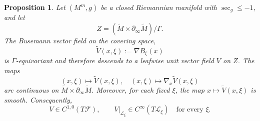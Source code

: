 \documentclass[12pt]{amsart}
\newtheorem{proposition}[theorem]{Proposition}
\theoremstyle{definition}
\numberwithin{equation}{section}
\newcommand{\mc}{\mathcal}
\newcommand{\wti}{\widetilde}
\begin{document}
\begin{proposition}
\label{prop:busemann-field-regularity}
Let \((M^m,g)\) be a closed Riemannian manifold with \(\sec_g\leq-1\), and
let
\[
  Z=(\wti M\times\partial_\infty\wti M)/\Gamma.
\]
The Busemann vector field on the covering space,
\[
  \widetilde V(x,\xi):=\nabla B_\xi(x)
\]
is \(\Gamma\)-equivariant and therefore descends to a leafwise unit vector
field \(V\) on \(Z\).  The maps
\[
  (x,\xi)\longmapsto\widetilde V(x,\xi),
  \quad
  (x,\xi)\longmapsto\nabla_x\widetilde V(x,\xi)
\]
are continuous on \(\wti M\times\partial_\infty\wti M\).  Moreover, for
each fixed \(\xi\), the map \(x\mapsto\widetilde V(x,\xi)\) is smooth.
Consequently,
\[
  V\in C^{1,0}(T\mc F),
  \qquad
  V|_{\mc L_\xi}\in C^\infty(T\mc L_\xi)
  \quad\text{for every }\xi.
\]
\end{proposition}
\end{document}
